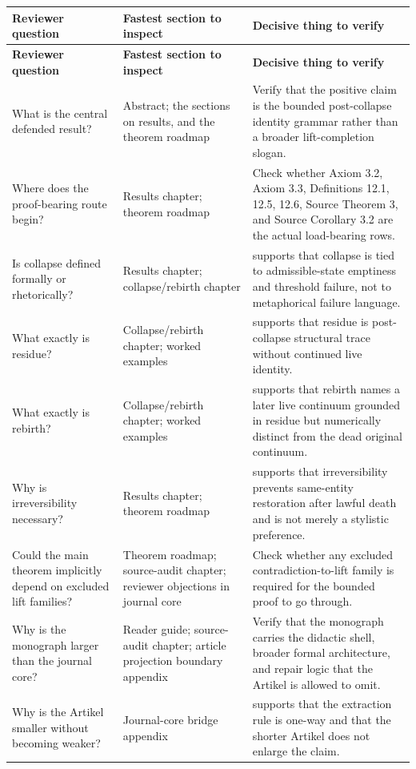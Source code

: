 \begin{longtable}{p{3.4cm} p{4.4cm} p{5.7cm}}
\toprule
\textbf{Reviewer question} & \textbf{Fastest section to inspect} & \textbf{Decisive thing to verify} \\
\midrule
\endfirsthead
\toprule
\textbf{Reviewer question} & \textbf{Fastest section to inspect} & \textbf{Decisive thing to verify} \\
\midrule
\endhead
\bottomrule
\endfoot
What is the central defended result? & Abstract; the sections on results, and the theorem roadmap & Verify that the positive claim is the bounded post-collapse identity grammar rather than a broader lift-completion slogan. \\
Where does the proof-bearing route begin? & Results chapter; theorem roadmap & Check whether Axiom 3.2, Axiom 3.3, Definitions 12.1, 12.5, 12.6, Source Theorem 3, and Source Corollary 3.2 are the actual load-bearing rows. \\
Is collapse defined formally or rhetorically? & Results chapter; collapse/rebirth chapter & supports that collapse is tied to admissible-state emptiness and threshold failure, not to metaphorical failure language. \\
What exactly is residue? & Collapse/rebirth chapter; worked examples & supports that residue is post-collapse structural trace without continued live identity. \\
What exactly is rebirth? & Collapse/rebirth chapter; worked examples & supports that rebirth names a later live continuum grounded in residue but numerically distinct from the dead original continuum. \\
Why is irreversibility necessary? & Results chapter; theorem roadmap & supports that irreversibility prevents same-entity restoration after lawful death and is not merely a stylistic preference. \\
Could the main theorem implicitly depend on excluded lift families? & Theorem roadmap; source-audit chapter; reviewer objections in journal core & Check whether any excluded contradiction-to-lift family is required for the bounded proof to go through. \\
Why is the monograph larger than the journal core? & Reader guide; source-audit chapter; article projection boundary appendix & Verify that the monograph carries the didactic shell, broader formal architecture, and repair logic that the Artikel is allowed to omit. \\
Why is the Artikel smaller without becoming weaker? & Journal-core bridge appendix & supports that the extraction rule is one-way and that the shorter Artikel does not enlarge the claim. \\

\end{longtable}
